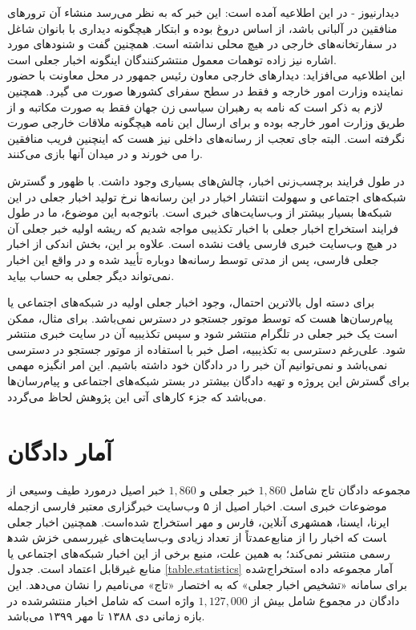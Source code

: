 \begin{enumerate}
دیدارنیوز - در این اطلاعیه آمده است: این خبر که به نظر می‌رسد منشاء آن ترور‌های منافقین در آلبانی باشد، از اساس دروغ بوده و ابتکار هیچگونه دیداری با بانوان شاغل در سفارتخانه‌های خارجی در هیچ محلی نداشته است. همچنین گفت و شنودهای مورد اشاره نیز زاده توهمات معمول منتشرکنندگان اینگونه اخبار جعلی است. 
\\
این اطلاعیه می‌افزاید: دیدارهای خارجی معاون رئیس جمهور در محل معاونت با حضور نماینده وزارت امور خارجه و فقط در سطح سفرای کشورها صورت می گیرد. همچنین لازم به ذکر است که نامه به رهبران سیاسی زن جهان فقط به صورت مکاتبه و از طریق وزارت امور خارجه بوده و برای ارسال این نامه هیچگونه ملاقات خارجی صورت نگرفته است. البته جای تعجب از رسانه‌های داخلی نیز هست که اینچنین فریب منافقین را می خورند و در میدان آنها بازی می‌کنند.
\end{enumerate}

در طول فرایند برچسب‌زنی اخبار، چالش‌های بسیاری وجود داشت. با ظهور و گسترش شبکه‌های اجتماعی و سهولت انتشار اخبار در این رسانه‌ها نرخ تولید اخبار جعلی در این شبکه‌ها بسیار بیشتر از وب‌سایت‌های خبری است. باتوجه‌به این موضوع، ما در طول فرایند استخراج اخبار جعلی با اخبار تکذیبی مواجه شدیم که ریشه اولیه خبر جعلی آن در هیچ وب‌سایت خبری فارسی یافت نشده‌ است. علاوه بر این، بخش اندکی از اخبار جعلی فارسی، پس از مدتی توسط رسانه‌ها دوباره تأیید شده و در واقع این اخبار نمی‌تواند دیگر جعلی به حساب بیاید.

برای دسته اول بالاترین احتمال، وجود اخبار جعلی اولیه در شبکه‌های اجتماعی یا پیام‌رسان‌ها هست که توسط موتور جستجو در دسترس نمی‌باشد. برای مثال، ممکن است یک خبر جعلی در تلگرام منتشر شود و سپس تکذیبیه آن در سایت خبری منتشر شود. علی‌رغم دسترسی به تکذیبیه، اصل خبر با استفاده از موتور جستجو در دسترسی نمی‌باشد و نمی‌توانیم آن خبر را در دادگان خود داشته باشیم. این امر انگیزه مهمی برای گسترش این پروژه و تهیه دادگان بیشتر در بستر شبکه‌های اجتماعی و پیام‌رسان‌ها می‌باشد که جزء کارهای آتی این پژوهش لحاظ می‌گردد.
\section{آمار دادگان}
مجموعه دادگان تاج شامل $1,860$ خبر جعلی و $1,860$ خبر اصیل درمورد طیف وسیعی از موضوعات خبری است. اخبار اصیل از ۵ وب‌سایت خبرگزاری معتبر فارسی ازجمله ایرنا، ایسنا، همشهری آنلاین، فارس و مهر استخراج شده‌است. همچنین اخبار جعلی عمدتاً از تعداد زیادی وب‌سایت‌های غیررسمی خزش‌ شده‎است که اخبار را از منابع رسمی منتشر نمی‌کند؛ به همین علت، منبع برخی از این اخبار شبکه‌های اجتماعی یا منابع غیرقابل اعتماد است.  جدول \ref{table.statistics} آمار مجموعه داده استخراج‌شده برای سامانه «تشخیص اخبار جعلی» که به اختصار «تاج» می‌نامیم  را نشان می‌دهد. این دادگان در مجموع شامل بیش از $1,127,000$ واژه است که  شامل اخبار منتشرشده در بازه زمانی دی ۱۳۸۸ تا مهر ۱۳۹۹ می‌باشد. 

